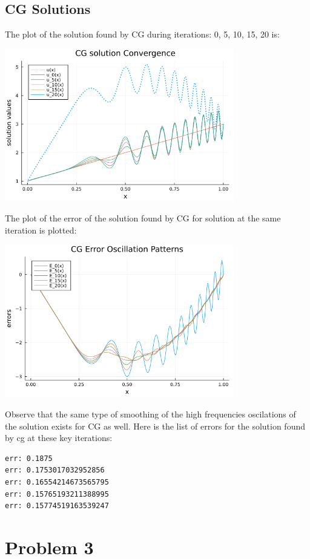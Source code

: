 \documentclass[]{article}
\begin{document}
    \subsection*{CG Solutions}
        The plot of the solution found by CG during iterations: 0, 5, 10, 15, 20 is: 
        \begin{center}
            \includegraphics[width=10cm]{p2_cg_solns.png}
        \end{center}
        The plot of the error of the solution found by CG for solution at the same iteration is plotted: 
        \begin{center}
            \includegraphics[width=10cm]{p2_cg_errors.png}
        \end{center}
        Observe that the same type of smoothing of the high frequencies oscilations of the solution exists for CG as well. Here is the list of errors for the solution found by cg at these key iterations: 
        \begin{verbatim}
err: 0.1875
err: 0.1753017032952856
err: 0.16554214673565795
err: 0.15765193211388995
err: 0.15774519163539247
        \end{verbatim}

\section*{Problem 3}
\end{document}
